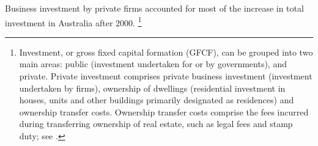 
Business investment by private firms accounted for most of the increase in total investment in Australia after 2000.%
\footnote{Investment, or gross fixed capital formation (GFCF), can be grouped into two main areas: public (investment undertaken for or by governments), and private. Private investment comprises private business investment (investment undertaken by firms), ownership of dwellings (residential investment in houses, units and other buildings primarily designated as residences) and ownership transfer costs. Ownership transfer costs comprise the fees incurred during transferring ownership of real estate, such as legal fees and stamp duty; see \textcite{abs2015_SNA}.}
